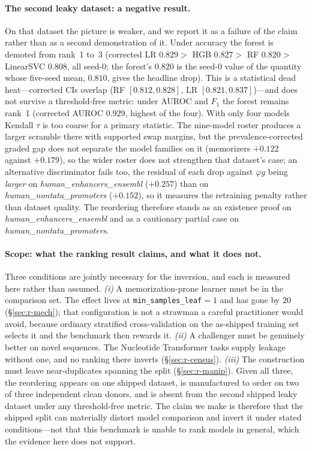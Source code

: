 \documentclass[webpdf,modern,large,namedate]{oup-authoring-template}%
\begin{document}
\paragraph{The second leaky dataset: a negative result.} On that dataset the picture is weaker, and we report it as a failure of the claim rather than as a second demonstration of it. Under accuracy the forest is demoted from rank~1 to~3 (corrected LR $0.829>$ HGB $0.827>$ RF $0.820>$ LinearSVC $0.808$, all seed-$0$; the forest's $0.820$ is the seed-$0$ value of the quantity whose five-seed mean, $0.810$, gives the headline drop). This is a statistical dead heat---corrected CIs overlap (RF $[0.812,0.828]$, LR $[0.821,0.837]$)---and does not survive a threshold-free metric: under AUROC and $F_1$ the forest remains rank~1 (corrected AUROC $0.929$, highest of the four). With only four models Kendall $\tau$ is too coarse for a primary statistic. The nine-model roster produces a larger scramble there with supported swap margins, but the prevalence-corrected graded gap does not separate the model families on it (memorizers $+0.122$ against $+0.179$), so the wider roster does not strengthen that dataset's case; an alternative discriminator fails too, the residual of each drop against $\varphi g$ being \emph{larger} on \textit{human\_enhancers\_ensembl} ($+0.257$) than on \textit{human\_nontata\_promoters} ($+0.152$), so it measures the retraining penalty rather than dataset quality. The reordering therefore stands as an existence proof on \textit{human\_enhancers\_ensembl} and as a cautionary partial case on \textit{human\_nontata\_promoters}.

\paragraph{Scope: what the ranking result claims, and what it does not.} Three conditions are jointly necessary for the inversion, and each is measured here rather than assumed. \emph{(i)} A memorization-prone learner must be in the comparison set. The effect lives at \texttt{min\_samples\_leaf}$=1$ and has gone by $20$ (\S\ref{sec:r-mech}); that configuration is not a strawman a careful practitioner would avoid, because ordinary stratified cross-validation on the as-shipped training set selects it and the benchmark then rewards it. \emph{(ii)} A challenger must be genuinely better on novel sequences. The Nucleotide Transformer tasks supply leakage without one, and no ranking there inverts (\S\ref{sec:r-census}). \emph{(iii)} The construction must leave near-duplicates spanning the split (\S\ref{sec:r-manip}). Given all three, the reordering appears on one shipped dataset, is manufactured to order on two of three independent clean donors, and is absent from the second shipped leaky dataset under any threshold-free metric. The claim we make is therefore that the shipped split can materially distort model comparison and invert it under stated conditions---not that this benchmark is unable to rank models in general, which the evidence here does not support.
\end{document}
